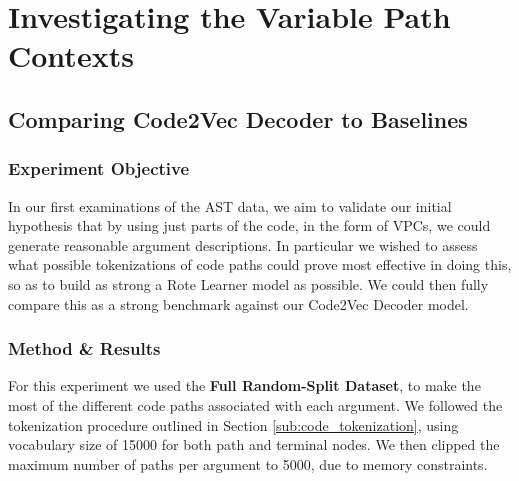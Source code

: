 \section{Investigating the Variable Path Contexts} %
\label{sec:investigating_the_computer_channel}

\subsection{Comparing Code2Vec Decoder to Baselines} %
\label{sub:comparing_code2vec_to_baselines}


\subsubsection{Experiment Objective} %

In our first examinations of the AST data, we aim to validate our initial hypothesis that by using just parts of the code, in the form of VPCs, we could generate reasonable argument descriptions.
In particular we wished to assess what possible tokenizations of code paths could prove most effective in doing this, so as to build as strong a Rote Learner model as possible. We could then fully compare this as a strong benchmark against our Code2Vec Decoder model.

\subsubsection{Method \& Results} %

For this experiment we used the \textbf{Full Random-Split Dataset}, to make the most of the different code paths associated with each argument.
We followed the tokenization procedure outlined in Section \ref{sub:code_tokenization}, using vocabulary size of 15000 for both path and terminal nodes. We then clipped the maximum number of paths per argument to 5000, due to memory constraints. 

